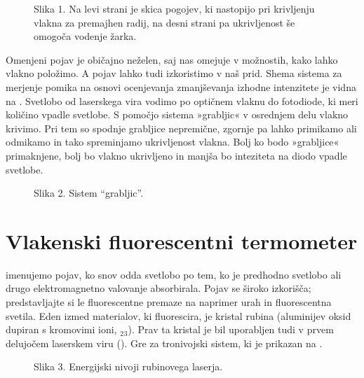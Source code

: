 \documentclass[letterpaper,10pt,english]{sphinxmanual}
\begin{document}
\begin{figure}[htbp]
\centering
\capstart

\noindent{}
\caption{Slika 1. Na levi strani je skica pogojev, ki nastopijo pri krivljenju vlakna za premajhen radij, na desni strani pa ukrivljenost še omogoča vodenje žarka.}\label{\detokenize{vlakenski_senzorji:id2}}\end{figure}

\sphinxAtStartPar
Omenjeni pojav je običajno neželen, saj nas omejuje v možnostih, kako lahko vlakno položimo. A pojav lahko tudi izkoristimo v naš prid. Shema sistema za merjenje pomika na osnovi ocenjevanja zmanjševanja izhodne intenzitete je vidna na . Svetlobo od laserskega vira vodimo po optičnem vlaknu do fotodiode, ki meri količino vpadle svetlobe. S pomočjo sistema »grabljic« v osrednjem delu vlakno krivimo. Pri tem so spodnje grabljice nepremične, zgornje pa lahko primikamo ali odmikamo in tako spreminjamo ukrivljenost vlakna. Bolj ko bodo »grabljice« primaknjene, bolj bo vlakno ukrivljeno in manjša bo inteziteta na diodo vpadle svetlobe.

\begin{figure}[htbp]
\centering
\capstart

\noindent{}
\caption{Slika 2. Sistem “grabljic”.}\label{\detokenize{vlakenski_senzorji:id3}}\end{figure}


\section{Vlakenski fluorescentni termometer}
\label{\detokenize{vlakenski_senzorji:vlakenski-fluorescentni-termometer}}
\sphinxAtStartPar
{} imenujemo pojav, ko snov odda svetlobo po tem, ko je predhodno svetlobo ali drugo elektromagnetno valovanje absorbirala. Pojav se široko izkorišča; predstavljajte si le fluorescentne premaze na naprimer urah in fluorescentna svetila.
Eden izmed materialov, ki fluorescira, je kristal rubina (aluminijev oksid dupiran s kromovimi ioni, $_{\text{2}}$$_{\text{3}}$). Prav ta kristal je bil uporabljen tudi v prvem delujočem laserskem viru (). Gre za tronivojski sistem, ki je prikazan na .

\begin{figure}[htbp]
\centering
\capstart

\noindent{}
\caption{Slika 3. Energijski nivoji rubinovega laserja.}\label{\detokenize{vlakenski_senzorji:id4}}\end{figure}
\end{document}
